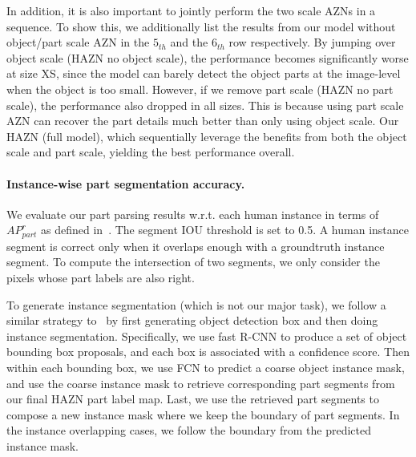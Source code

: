 In addition, it is also important to jointly perform the two scale AZNs in a sequence. To show this, we additionally list the results from our model without object/part scale AZN in the $5_{th}$ and the $6_{th}$ row respectively. 
By jumping over object scale (HAZN no object scale), the performance becomes significantly worse at size XS,
since the model can barely detect the object parts at the image-level when the object is too small.  However, if we remove part scale (HAZN no part scale),
the performance also dropped in all sizes. This is because using part scale AZN can recover the part details much better than only using object scale.
Our HAZN (full model), which sequentially leverage the benefits from both the object scale and part scale, yielding the best performance overall.

\paragraph{\textbf{Instance-wise part segmentation accuracy.}} 
We evaluate our part parsing results w.r.t. each human instance in terms of $AP^r_{part}$ as defined in~\cite{hariharan2015hypercolumns}. The segment IOU threshold is set to 0.5. A human instance segment is correct only when it overlaps enough with a groundtruth instance segment. To compute the intersection of two segments, we only consider the pixels whose part labels are also right.

\begin{table}
  \centering
  \setlength{\tabcolsep}{10pt}
  \caption{Instance-wise part segmentation accuracy on PASCAL-Person-Part in terms of $AP^r_{part}$.}
\label{table:apr_part_eccv}
\end{table}  

To generate instance segmentation (which is not our major task), we follow a similar strategy to~\cite{hariharan2015hypercolumns} by first generating object detection box and then doing instance segmentation. Specifically, we use fast R-CNN to produce a set of object bounding box proposals, and each box is associated with a confidence score. Then within each bounding box, we use FCN to predict a coarse object instance mask, and use the coarse instance mask to retrieve corresponding part segments from our final HAZN part label map. Last, we use the retrieved part segments to compose a new instance mask where we keep the boundary of part segments. In the instance overlapping cases, we follow the boundary from the predicted instance mask.

